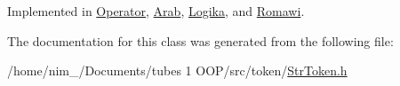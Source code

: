 Implemented in \hyperlink{class_operator_a7059095d7977dbdda3068f506b6ed70a}{Operator}, \hyperlink{class_arab_a107f2bde10c4cd4dfd18a44db5739b4c}{Arab}, \hyperlink{class_logika_af52abd9fefcea94bedc313ce61987b3e}{Logika}, and \hyperlink{class_romawi_aacb2db408231ac236b1378f44c501508}{Romawi}.



The documentation for this class was generated from the following file\-:\begin{DoxyCompactItemize}
\item 
/home/nim\-\_/\-Documents/tubes 1 O\-O\-P/src/token/\hyperlink{_str_token_8h}{Str\-Token.\-h}\end{DoxyCompactItemize}

